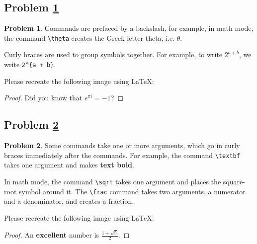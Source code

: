 \documentclass[11pt]{article}
\theoremstyle{definition}
\theoremstyle{definition}
\newtheorem{required}{Problem}
\theoremstyle{definition}
\begin{document}
\newpage
\subsection{Problem \ref{Latex2}} 
\begin{required} \label{Latex2}
Commands are prefaced by a backslash, for example, in math mode, the command \texttt{\textbackslash theta} creates the Greek letter theta, i.e. $\theta$.

Curly braces are used to group symbols together. For example, to write $2^{a + b}$, we write \texttt{2\^{}\{a + b\}}.

Please recreate the following image using \LaTeX:

\end{required}

\begin{proof}
Did you know that $e^{\pi i} = -1$?
\end{proof}



\newpage
\subsection{Problem \ref{Latex3}}
\begin{required} \label{Latex3}
Some commands take one or more arguments, which go in curly braces immediately after the commands. For example, the command \texttt{\textbackslash textbf} takes one argument and makes \textbf{text bold}.

In math mode, the command \texttt{\textbackslash sqrt} takes one argument and places the square-root symbol around it. The \texttt{\textbackslash frac} command takes two arguments, a numerator and a denominator, and creates a fraction.

Please recreate the following image using \LaTeX:

\end{required}

\begin{proof}
An \textbf{excellent} number is $\frac{1+\sqrt{5}}{2}$.
\end{proof}
\end{document}
